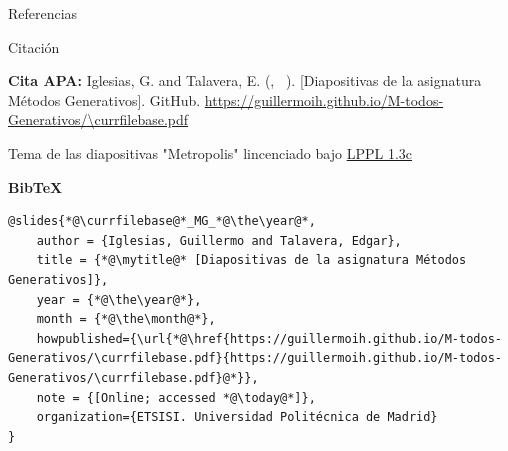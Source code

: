 
\begin{frame}[allowframebreaks]{Referencias}
    
    
\end{frame}

\begin{frame}[fragile]{Citación}

{\footnotesize
\textbf{Cita APA:} Iglesias, G. and Talavera, E. (\the\year, \mesnombre ~\the\day). \textit{\mytitle} [Diapositivas de la asignatura Métodos Generativos]. GitHub. \url{https://guillermoih.github.io/M-todos-Generativos/\currfilebase.pdf}
}

Tema de las diapositivas "Metropolis" lincenciado bajo \href{https://www.latex-project.org/lppl/lppl-1-3c/}{LPPL 1.3c}

{\footnotesize\textbf{BibTeX}}

{\tiny
\begin{lstlisting}[breaklines]
@slides{*@\currfilebase@*_MG_*@\the\year@*,
    author = {Iglesias, Guillermo and Talavera, Edgar},
    title = {*@\mytitle@* [Diapositivas de la asignatura Métodos Generativos]},
    year = {*@\the\year@*},
    month = {*@\the\month@*},
    howpublished={\url{*@\href{https://guillermoih.github.io/M-todos-Generativos/\currfilebase.pdf}{https://guillermoih.github.io/M-todos-Generativos/\currfilebase.pdf}@*}},
    note = {[Online; accessed *@\today@*]},
    organization={ETSISI. Universidad Politécnica de Madrid}
}
\end{lstlisting}
}
\end{frame}